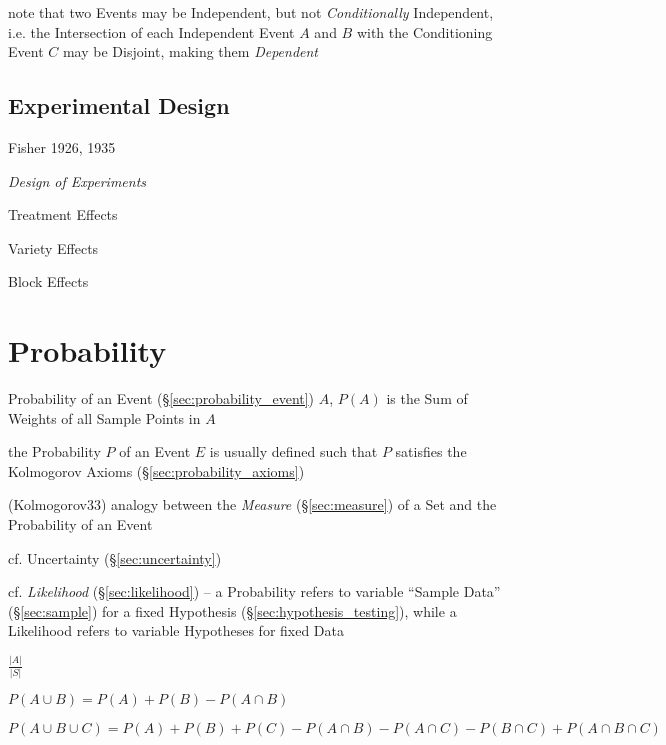 note that two Events may be Independent, but not \emph{Conditionally}
Independent, i.e. the Intersection of each Independent Event $A$ and $B$ with
the Conditioning Event $C$ may be Disjoint, making them \emph{Dependent}



\subsection{Experimental Design}\label{sec:experimental_design}


Fisher 1926, 1935

\emph{Design of Experiments}

Treatment Effects

Variety Effects

Block Effects



\section{Probability}\label{sec:probability}

Probability of an Event (\S\ref{sec:probability_event}) $A$, $P(A)$ is the Sum
of Weights of all Sample Points in $A$

the Probability $P$ of an Event $E$ is usually defined such that $P$ satisfies
the Kolmogorov Axioms (\S\ref{sec:probability_axioms})

(Kolmogorov33) analogy between the \emph{Measure} (\S\ref{sec:measure}) of a Set
and the Probability of an Event

cf. Uncertainty (\S\ref{sec:uncertainty})

cf. \emph{Likelihood} (\S\ref{sec:likelihood}) -- a Probability refers to
variable ``Sample Data'' (\S\ref{sec:sample}) for a fixed Hypothesis
(\S\ref{sec:hypothesis_testing}), while a Likelihood refers to variable
Hypotheses for fixed Data

$\frac{|A|}{|S|}$

$P(A \cup B) = P(A) + P(B) - P(A \cap B)$

$P(A \cup B \cup C) = P(A) + P(B) + P(C) - P(A \cap B) - P(A \cap C) -
P(B \cap C) + P(A \cap B \cap C)$

